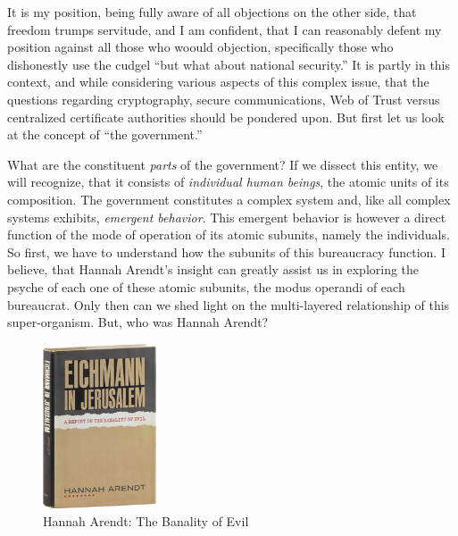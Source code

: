 \documentclass[twoside,twocolumn]{article}
\begin{document}
It is my position, being fully aware of all objections on the other side, that freedom trumps servitude, and I am confident, that I can reasonably defent
my position against all those who woould objection, specifically those who dishonestly use the cudgel  ``but what about national security.''
It is partly in this context,
and while considering various aspects of this complex issue, 
that the questions regarding cryptography, secure communications,
Web of Trust versus centralized certificate authorities should be pondered upon.
But first let us look at the concept of ``the government.''

What are the constituent \textit{parts} of the government?
If we dissect this entity, we will recognize, that it consists of
\textit{individual human beings},
the atomic units of its composition.
The government constitutes a complex system and, like all complex systems exhibits, \textit{emergent behavior}.
This emergent behavior is however a direct function of the mode of operation of its atomic subunits, namely the individuals.
So first, we have to understand how the subunits of this bureaucracy function.
I believe, that Hannah Arendt's insight can greatly assist us in exploring the
psyche of each one of these atomic subunits,
the modus operandi of each bureaucrat.
Only then can we shed light on the multi-layered relationship of this super-organism.
But, who was Hannah Arendt?


\begin{figure}
\centering
  \includegraphics[width=0.30\textwidth]{i/banality.jpg}
  \caption{Hannah Arendt: The Banality of Evil}
\end{figure}
\end{document}
